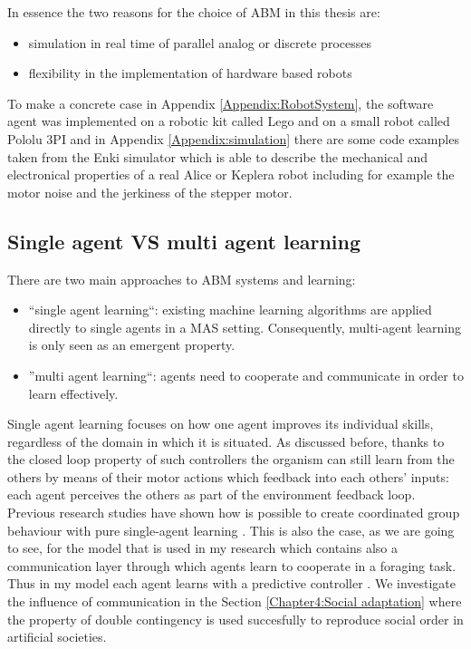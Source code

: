 In essence the two reasons for the choice of ABM in this thesis are:
\begin{itemize}
 \item simulation in real time of parallel analog or discrete processes
 \item flexibility in the implementation of hardware based robots
\end{itemize}
To make a concrete case in Appendix \ref{Appendix:RobotSystem}, the software agent 
was implemented on a robotic kit called Lego and on a small robot called Pololu 3PI 
and in Appendix \ref{Appendix:simulation} there are some code examples taken from
 the Enki simulator which is able to describe the mechanical and electronical properties
 of a real Alice or Keplera robot including for example the motor noise and the jerkiness 
of the stepper motor.



\subsection{Single agent VS multi agent learning}
There are two main approaches to ABM systems and learning:
\begin{itemize}
 \item ``single agent learning``: existing machine learning algorithms are applied
directly to single agents in a MAS setting. Consequently, multi-agent learning is only
seen as an emergent property.
\item ''multi agent learning``: agents need to cooperate and communicate in order
to learn effectively.
\end{itemize}

Single agent learning \citep{StoneVeloso98:RoboCup,Porr2006ICO,Porr2003b} 
focuses on how one agent improves
its individual skills, regardless of the domain in which it is situated.
As discussed before, thanks to the closed loop property of such controllers the 
organism can still learn from the others by means of their motor actions which 
feedback into each others' inputs: each agent perceives the others as part of the environment feedback loop.
Previous research studies have shown how is possible to create  coordinated group behaviour 
with pure single-agent learning \citep{Sugawara98learningto}.
This is also the case, as we are going to see, for the model that is used in my research which
contains also a communication layer through which agents learn to cooperate in a foraging task.
Thus in my model each agent learns with a predictive controller \citep{Porr2006ICO}.
We investigate the influence of communication in the Section \ref{Chapter4:Social adaptation} 
where the property of double contingency is used succesfully to reproduce social order
 in artificial societies.


